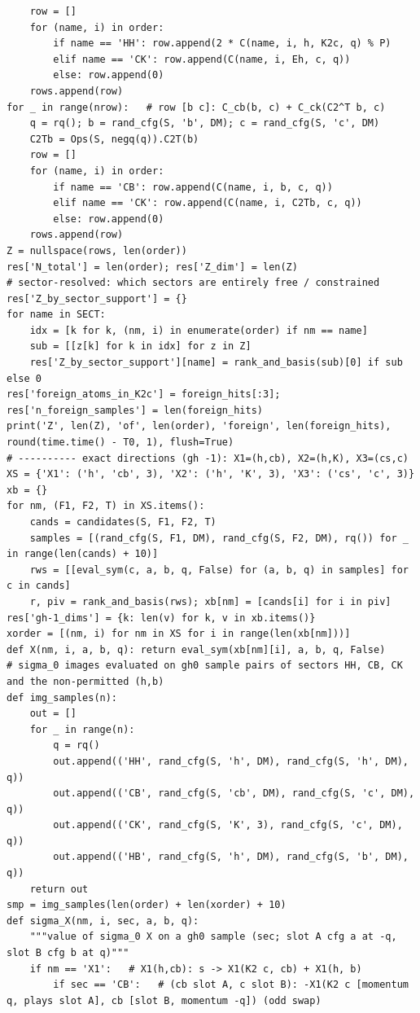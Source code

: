 \documentclass[10pt]{article}
\begin{document}
\begin{lstlisting}
    row = []
    for (name, i) in order:
        if name == 'HH': row.append(2 * C(name, i, h, K2c, q) % P)
        elif name == 'CK': row.append(C(name, i, Eh, c, q))
        else: row.append(0)
    rows.append(row)
for _ in range(nrow):   # row [b c]: C_cb(b, c) + C_ck(C2^T b, c)
    q = rq(); b = rand_cfg(S, 'b', DM); c = rand_cfg(S, 'c', DM)
    C2Tb = Ops(S, negq(q)).C2T(b)
    row = []
    for (name, i) in order:
        if name == 'CB': row.append(C(name, i, b, c, q))
        elif name == 'CK': row.append(C(name, i, C2Tb, c, q))
        else: row.append(0)
    rows.append(row)
Z = nullspace(rows, len(order))
res['N_total'] = len(order); res['Z_dim'] = len(Z)
# sector-resolved: which sectors are entirely free / constrained
res['Z_by_sector_support'] = {}
for name in SECT:
    idx = [k for k, (nm, i) in enumerate(order) if nm == name]
    sub = [[z[k] for k in idx] for z in Z]
    res['Z_by_sector_support'][name] = rank_and_basis(sub)[0] if sub else 0
res['foreign_atoms_in_K2c'] = foreign_hits[:3]; res['n_foreign_samples'] = len(foreign_hits)
print('Z', len(Z), 'of', len(order), 'foreign', len(foreign_hits), round(time.time() - T0, 1), flush=True)
# ---------- exact directions (gh -1): X1=(h,cb), X2=(h,K), X3=(cs,c)
XS = {'X1': ('h', 'cb', 3), 'X2': ('h', 'K', 3), 'X3': ('cs', 'c', 3)}
xb = {}
for nm, (F1, F2, T) in XS.items():
    cands = candidates(S, F1, F2, T)
    samples = [(rand_cfg(S, F1, DM), rand_cfg(S, F2, DM), rq()) for _ in range(len(cands) + 10)]
    rws = [[eval_sym(c, a, b, q, False) for (a, b, q) in samples] for c in cands]
    r, piv = rank_and_basis(rws); xb[nm] = [cands[i] for i in piv]
res['gh-1_dims'] = {k: len(v) for k, v in xb.items()}
xorder = [(nm, i) for nm in XS for i in range(len(xb[nm]))]
def X(nm, i, a, b, q): return eval_sym(xb[nm][i], a, b, q, False)
# sigma_0 images evaluated on gh0 sample pairs of sectors HH, CB, CK and the non-permitted (h,b)
def img_samples(n):
    out = []
    for _ in range(n):
        q = rq()
        out.append(('HH', rand_cfg(S, 'h', DM), rand_cfg(S, 'h', DM), q))
        out.append(('CB', rand_cfg(S, 'cb', DM), rand_cfg(S, 'c', DM), q))
        out.append(('CK', rand_cfg(S, 'K', 3), rand_cfg(S, 'c', DM), q))
        out.append(('HB', rand_cfg(S, 'h', DM), rand_cfg(S, 'b', DM), q))
    return out
smp = img_samples(len(order) + len(xorder) + 10)
def sigma_X(nm, i, sec, a, b, q):
    """value of sigma_0 X on a gh0 sample (sec; slot A cfg a at -q, slot B cfg b at q)"""
    if nm == 'X1':   # X1(h,cb): s -> X1(K2 c, cb) + X1(h, b)
        if sec == 'CB':   # (cb slot A, c slot B): -X1(K2 c [momentum q, plays slot A], cb [slot B, momentum -q]) (odd swap)

\end{lstlisting}
\end{document}
